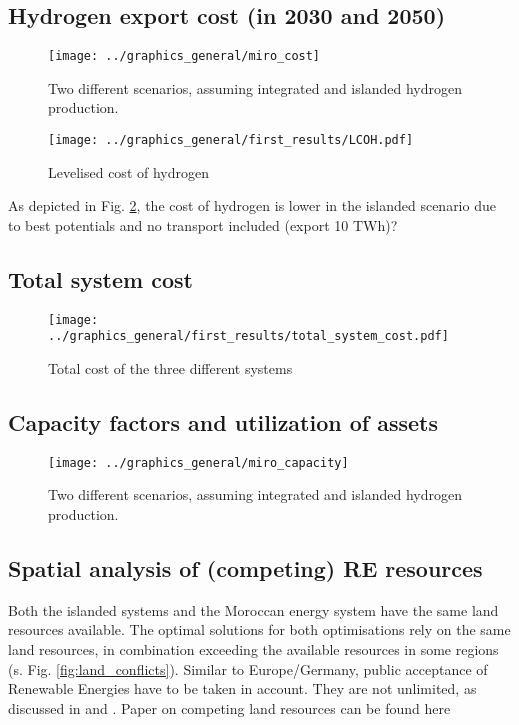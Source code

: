 \subsection{Hydrogen export cost (in 2030 and 2050)}

\begin{figure}[h!]
    \centering
    \texttt{[image: ../graphics\_general/miro\_cost]}
    \caption{Two different scenarios, assuming integrated and islanded hydrogen production.}
    \label{fig:results_costs}
\end{figure}

\begin{figure}[h!]
    \centering
    \texttt{[image: ../graphics\_general/first\_results/LCOH.pdf]}
    \caption{Levelised cost of hydrogen}
    \label{fig:LCOH}
\end{figure}

As depicted in Fig. \ref{fig:LCOH}, the cost of hydrogen is lower in the islanded scenario due to best potentials and no transport included (export 10 TWh)?


\subsection{Total system cost}

\begin{figure}[h!]
    \centering
    \texttt{[image: ../graphics\_general/first\_results/total\_system\_cost.pdf]}
    \caption{Total cost of the three different systems}
    \label{fig:total_system_cost}
\end{figure}

\subsection{Capacity factors and utilization of assets}

\begin{figure}[h!]
    \centering
    \texttt{[image: ../graphics\_general/miro\_capacity]}
    \caption{Two different scenarios, assuming integrated and islanded hydrogen production.}
    \label{fig:results_capacity}
\end{figure}

\subsection{Spatial analysis of (competing) RE resources}
Both the islanded systems and the Moroccan energy system have the same land resources available. 
The optimal solutions for both optimisations rely on the same land resources, in combination exceeding the 
available resources in some regions (s. Fig. \ref{fig:land_conflicts}). 
Similar to Europe/Germany, public acceptance of Renewable Energies have to be taken in account. 
They are not unlimited, as discussed in \cite{Hanger2016} and \cite{TerraponPfaff2019}.
Paper on competing land resources can be found here \cite{Patankar2022}

